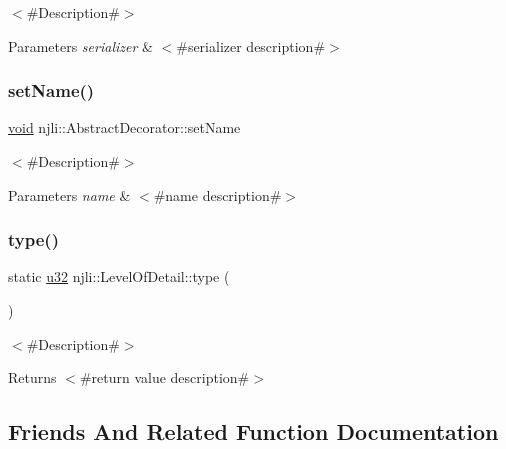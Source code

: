 $<$\#\+Description\#$>$


\begin{DoxyParams}{Parameters}
{\em serializer} & $<$\#serializer description\#$>$ \\
\hline
\end{DoxyParams}
\mbox{\label{classnjli_1_1_level_of_detail_a087eb5f8d9f51cc476f12f1d10a3cb95}} 
\subsubsection{\texorpdfstring{set\+Name()}{setName()}}
{\footnotesize\ttfamily \mbox{\hyperlink{_thread_8h_af1e856da2e658414cb2456cb6f7ebc66}{void}} njli\+::\+Abstract\+Decorator\+::set\+Name}

$<$\#\+Description\#$>$


\begin{DoxyParams}{Parameters}
{\em name} & $<$\#name description\#$>$ \\
\hline
\end{DoxyParams}
\mbox{\label{classnjli_1_1_level_of_detail_abf3736edff218865fabdd0586ae9f581}} 
\subsubsection{\texorpdfstring{type()}{type()}}
{\footnotesize\ttfamily static \mbox{\hyperlink{_util_8h_a10e94b422ef0c20dcdec20d31a1f5049}{u32}} njli\+::\+Level\+Of\+Detail\+::type (\begin{DoxyParamCaption}{ }\end{DoxyParamCaption})\hspace{0.3cm}{\ttfamily [static]}}

$<$\#\+Description\#$>$

\begin{DoxyReturn}{Returns}
$<$\#return value description\#$>$ 
\end{DoxyReturn}


\subsection{Friends And Related Function Documentation}
\mbox{\label{classnjli_1_1_level_of_detail_acb96ebb09abe8f2a37a915a842babfac}} 

